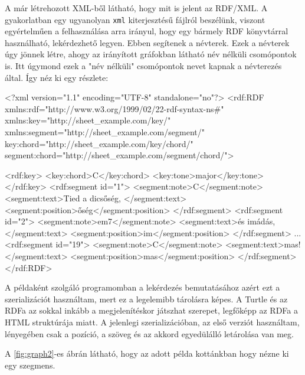 A már létrehozott XML-ből látható, hogy mit is jelent az RDF/XML. A gyakorlatban egy ugyanolyan \texttt{xml} kiterjesztésű fájlról beszélünk, viszont egyértelműen a felhasználása arra irányul, hogy egy bármely RDF könyvtárral használható, lekérdezhető legyen. Ebben segítenek a névterek. Ezek a névterek úgy jönnek létre, ahogy az irányított gráfokban látható név nélküli csomópontok is. Itt úgymond ezek a "név nélküli" csomópontok nevet kapnak a névterezés által.
Így néz ki egy részlete:
\begin{xml}
	<?xml version="1.1" encoding="UTF-8" standalone="no"?>
	<rdf:RDF 
			xmlns:rdf="http://www.w3.org/1999/02/22-rdf-syntax-ns#"
			xmlns:key="http://sheet_example.com/key/"
			xmlns:segment="http://sheet_example.com/segment/"
			key:chord="http://sheet_example.com/key/chord/"
			segment:chord="http://sheet_example.com/segment/chord/">
	
	        <rdf:key>
	            <key:chord>C</key:chord>
	            <key:tone>major</key:tone>
	        </rdf:key>
	        <rdf:segment id="1">
	            <segment:note>C</segment:note>
	            <segment:text>Tied a dicsőség, </segment:text>
	            <segment:position>őség</segment:position>
	        </rdf:segment>
	        <rdf:segment id="2">
	            <segment:note>em7</segment:note>
	            <segment:text>és imádás,\n</segment:text>
	            <segment:position>im</segment:position>
	        </rdf:segment>
	        ...
	        <rdf:segment id="19">
	            <segment:note>C</segment:note>
	            <segment:text>mas!</segment:text>
	            <segment:position>mas</segment:position>
	        </rdf:segment>
	</rdf:RDF>
\end{xml}

A példaként szolgáló programomban a lekérdezés bemutatásához azért ezt a szerializációt használtam, mert ez a legelemibb tárolásra képes. A Turtle és az RDFa az sokkal inkább a megjelenítéskor játszhat szerepet, legfőképp az RDFa a HTML struktúrája miatt. A jelenlegi szerializációban, az első verziót használtam, lényegében csak a pozíció, a szöveg és az akkord egyedülálló letárolása van meg.


A \ref{fig:graph2}-es ábrán látható, hogy az adott példa kottánkban hogy nézne ki egy szegmens.

